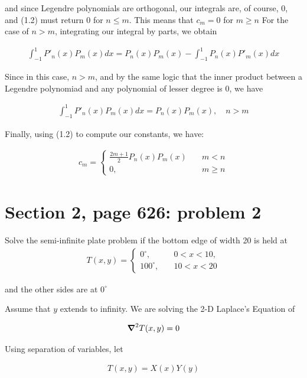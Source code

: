 \documentclass{article}
\numberwithin{equation}{section}
\begin{document}
and since Legendre polynomials are orthogonal, our integrals are, of course, 0, and (1.2) must return $0$ for $n \leq m$. This means that $c_m = 0$ for $m \geq n$ For the case of $n > m$, integrating our integral by parts, we obtain

\begin{align}
    \int_{-1}^{1} P'_n(x) P_m(x) dx = P_n(x) P_m (x) - \int_{-1}^{1} P_n(x) P'_m(x) dx
\end{align}

Since in this case, $n > m$, and by the same logic that the inner product between a Legendre polynomiad and any polynomial of lesser degree is $0$, we have 

\begin{align}
    \int_{-1}^{1} P'_n(x) P_m(x) dx = P_n(x) P_m (x), \quad n > m
\end{align}

Finally, using (1.2) to compute our constants, we have:

\begin{align}
    c_m = \begin{cases}
        \frac{2m+1}{2} P_n(x) P_m(x) \quad &m < n \\
        0, &m \geq n
    \end{cases}
\end{align}

\section{Section 2, page 626: problem 2}
Solve the semi-infinite plate problem if the bottom edge of width 20 is held at 
\begin{align*}
    T(x,y) = \begin{cases}
        0^{\circ}, \quad &0 < x < 10, \\
        100^{\circ}, \quad &10 < x < 20
    \end{cases}
\end{align*}

and the other sides are at $0^{\circ}$

Assume that $y$ extends to infinity. We are solving the 2-D Laplace's Equation of 

\begin{align}
    \grad^2 T(x,y) = 0
\end{align}

Using separation of variables, let 

\begin{align}
    T(x,y) = X(x) Y(y)
\end{align}
\end{document}
